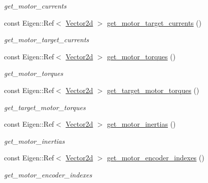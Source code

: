 \begin{DoxyCompactItemize}
\begin{DoxyCompactList}\small\item\em get\+\_\+motor\+\_\+currents \end{DoxyCompactList}\item 
const Eigen\+::\+Ref$<$ \hyperlink{common__header_8hpp_acb6916bc8c9fe9d98c484fd4cc201447}{Vector2d} $>$ \hyperlink{classblmc__robots_1_1Stuggihop_a8caaf3092fab4df7cb4a21c785a92caa}{get\+\_\+motor\+\_\+target\+\_\+currents} ()
\begin{DoxyCompactList}\small\item\em get\+\_\+motor\+\_\+target\+\_\+currents \end{DoxyCompactList}\item 
const Eigen\+::\+Ref$<$ \hyperlink{common__header_8hpp_acb6916bc8c9fe9d98c484fd4cc201447}{Vector2d} $>$ \hyperlink{classblmc__robots_1_1Stuggihop_aa3c24185a4ce67f235c535e4913832d2}{get\+\_\+motor\+\_\+torques} ()
\begin{DoxyCompactList}\small\item\em get\+\_\+motor\+\_\+torques \end{DoxyCompactList}\item 
const Eigen\+::\+Ref$<$ \hyperlink{common__header_8hpp_acb6916bc8c9fe9d98c484fd4cc201447}{Vector2d} $>$ \hyperlink{classblmc__robots_1_1Stuggihop_aa37d49ec5e4fb52bac480aa552fc4546}{get\+\_\+target\+\_\+motor\+\_\+torques} ()
\begin{DoxyCompactList}\small\item\em get\+\_\+target\+\_\+motor\+\_\+torques \end{DoxyCompactList}\item 
const Eigen\+::\+Ref$<$ \hyperlink{common__header_8hpp_acb6916bc8c9fe9d98c484fd4cc201447}{Vector2d} $>$ \hyperlink{classblmc__robots_1_1Stuggihop_acffc9bf97d4b58ad49703855a70b95cf}{get\+\_\+motor\+\_\+inertias} ()
\begin{DoxyCompactList}\small\item\em get\+\_\+motor\+\_\+inertias \end{DoxyCompactList}\item 
const Eigen\+::\+Ref$<$ \hyperlink{common__header_8hpp_acb6916bc8c9fe9d98c484fd4cc201447}{Vector2d} $>$ \hyperlink{classblmc__robots_1_1Stuggihop_a41fda0b6e5b070341e342291c1d0fd1d}{get\+\_\+motor\+\_\+encoder\+\_\+indexes} ()
\begin{DoxyCompactList}\small\item\em get\+\_\+motor\+\_\+encoder\+\_\+indexes \end{DoxyCompactList}\item 

\end{DoxyCompactItemize}
